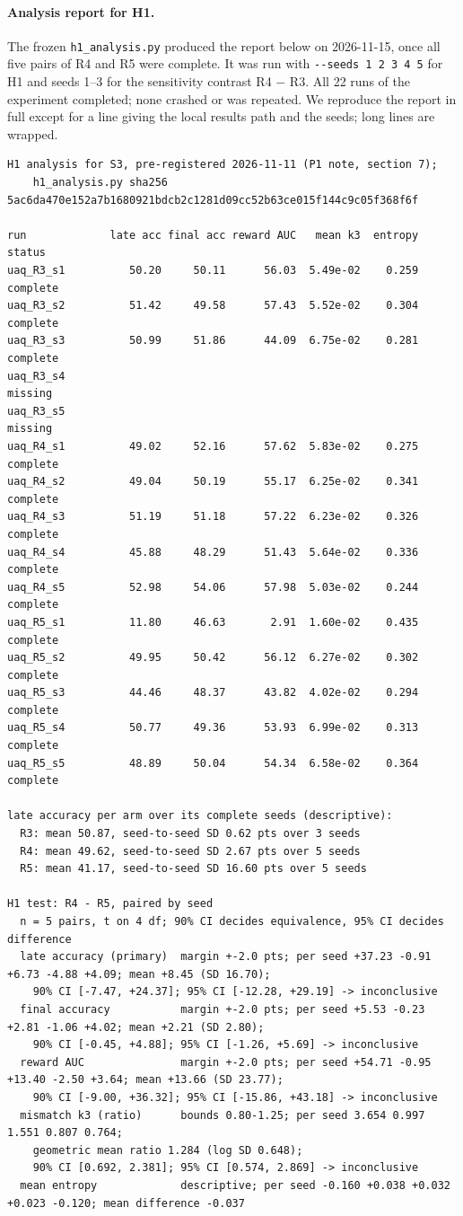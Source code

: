 \paragraph{Analysis report for H1.} The frozen \texttt{h1\_analysis.py} produced the report below on 2026-11-15, once all five pairs of R4 and R5 were complete. It was run with \texttt{-{}-seeds 1 2 3 4 5} for H1 and seeds 1--3 for the sensitivity contrast R4 $-$ R3. All 22 runs of the experiment completed; none crashed or was repeated. We reproduce the report in full except for a line giving the local results path and the seeds; long lines are wrapped.
{\scriptsize
\begin{verbatim}
H1 analysis for S3, pre-registered 2026-11-11 (P1 note, section 7);
    h1_analysis.py sha256 5ac6da470e152a7b1680921bdcb2c1281d09cc52b63ce015f144c9c05f368f6f

run             late acc final acc reward AUC   mean k3  entropy  status
uaq_R3_s1          50.20     50.11      56.03  5.49e-02    0.259  complete
uaq_R3_s2          51.42     49.58      57.43  5.52e-02    0.304  complete
uaq_R3_s3          50.99     51.86      44.09  6.75e-02    0.281  complete
uaq_R3_s4                                                         missing
uaq_R3_s5                                                         missing
uaq_R4_s1          49.02     52.16      57.62  5.83e-02    0.275  complete
uaq_R4_s2          49.04     50.19      55.17  6.25e-02    0.341  complete
uaq_R4_s3          51.19     51.18      57.22  6.23e-02    0.326  complete
uaq_R4_s4          45.88     48.29      51.43  5.64e-02    0.336  complete
uaq_R4_s5          52.98     54.06      57.98  5.03e-02    0.244  complete
uaq_R5_s1          11.80     46.63       2.91  1.60e-02    0.435  complete
uaq_R5_s2          49.95     50.42      56.12  6.27e-02    0.302  complete
uaq_R5_s3          44.46     48.37      43.82  4.02e-02    0.294  complete
uaq_R5_s4          50.77     49.36      53.93  6.99e-02    0.313  complete
uaq_R5_s5          48.89     50.04      54.34  6.58e-02    0.364  complete

late accuracy per arm over its complete seeds (descriptive):
  R3: mean 50.87, seed-to-seed SD 0.62 pts over 3 seeds
  R4: mean 49.62, seed-to-seed SD 2.67 pts over 5 seeds
  R5: mean 41.17, seed-to-seed SD 16.60 pts over 5 seeds

H1 test: R4 - R5, paired by seed
  n = 5 pairs, t on 4 df; 90% CI decides equivalence, 95% CI decides difference
  late accuracy (primary)  margin +-2.0 pts; per seed +37.23 -0.91 +6.73 -4.88 +4.09; mean +8.45 (SD 16.70);
    90% CI [-7.47, +24.37]; 95% CI [-12.28, +29.19] -> inconclusive
  final accuracy           margin +-2.0 pts; per seed +5.53 -0.23 +2.81 -1.06 +4.02; mean +2.21 (SD 2.80);
    90% CI [-0.45, +4.88]; 95% CI [-1.26, +5.69] -> inconclusive
  reward AUC               margin +-2.0 pts; per seed +54.71 -0.95 +13.40 -2.50 +3.64; mean +13.66 (SD 23.77);
    90% CI [-9.00, +36.32]; 95% CI [-15.86, +43.18] -> inconclusive
  mismatch k3 (ratio)      bounds 0.80-1.25; per seed 3.654 0.997 1.551 0.807 0.764;
    geometric mean ratio 1.284 (log SD 0.648);
    90% CI [0.692, 2.381]; 95% CI [0.574, 2.869] -> inconclusive
  mean entropy             descriptive; per seed -0.160 +0.038 +0.032 +0.023 -0.120; mean difference -0.037


\end{verbatim}}
